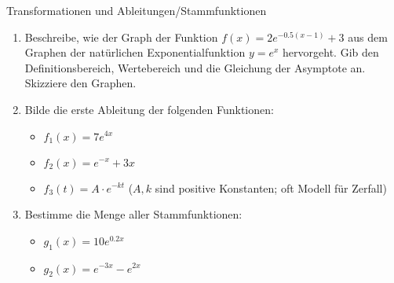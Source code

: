 \begin{aufgabenumgebung}{Transformationen und Ableitungen/Stammfunktionen}
\begin{enumerate}
    \item Beschreibe, wie der Graph der Funktion $f(x) = 2e^{-0.5(x-1)} + 3$ aus dem Graphen der natürlichen Exponentialfunktion $y=e^x$ hervorgeht. Gib den Definitionsbereich, Wertebereich und die Gleichung der Asymptote an. Skizziere den Graphen.
    \item Bilde die erste Ableitung der folgenden Funktionen:
        \begin{itemize}
            \item $f_1(x) = 7e^{4x}$
            \item $f_2(x) = e^{-x} + 3x$
            \item $f_3(t) = A \cdot e^{-kt}$ ($A, k$ sind positive Konstanten; oft Modell für Zerfall)
        \end{itemize}
    \item Bestimme die Menge aller Stammfunktionen:
        \begin{itemize}
            \item $g_1(x) = 10e^{0.2x}$
            \item $g_2(x) = e^{-3x} - e^{2x}$
        \end{itemize}
\end{enumerate}
\end{aufgabenumgebung}


